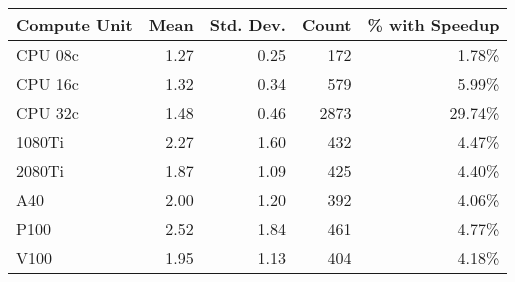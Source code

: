 \begin{tabular}{lrrrr}
\toprule
Compute Unit & Mean & Std. Dev. & Count & \% with Speedup \\
\midrule\midrule
CPU 08c & 1.27 & 0.25 & 172 & 1.78\% \\
CPU 16c & 1.32 & 0.34 & 579 & 5.99\% \\
CPU 32c & 1.48 & 0.46 & 2873 & 29.74\% \\
1080Ti & 2.27 & 1.60 & 432 & 4.47\% \\
2080Ti & 1.87 & 1.09 & 425 & 4.40\% \\
A40 & 2.00 & 1.20 & 392 & 4.06\% \\
P100 & 2.52 & 1.84 & 461 & 4.77\% \\
V100 & 1.95 & 1.13 & 404 & 4.18\% \\
\bottomrule
\end{tabular}
